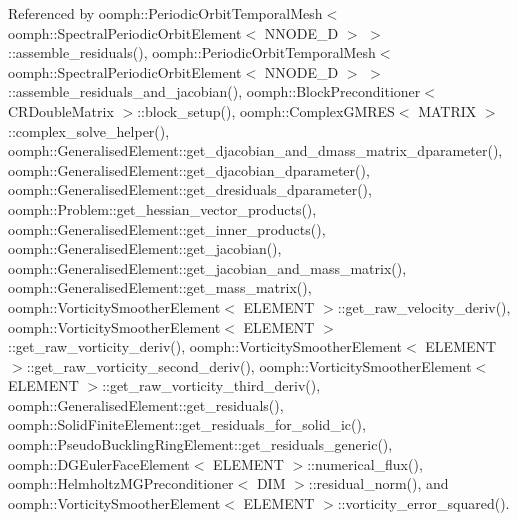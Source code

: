 Referenced by oomph\+::\+Periodic\+Orbit\+Temporal\+Mesh$<$ oomph\+::\+Spectral\+Periodic\+Orbit\+Element$<$ N\+N\+O\+D\+E\+\_\+D $>$ $>$\+::assemble\+\_\+residuals(), oomph\+::\+Periodic\+Orbit\+Temporal\+Mesh$<$ oomph\+::\+Spectral\+Periodic\+Orbit\+Element$<$ N\+N\+O\+D\+E\+\_\+D $>$ $>$\+::assemble\+\_\+residuals\+\_\+and\+\_\+jacobian(), oomph\+::\+Block\+Preconditioner$<$ C\+R\+Double\+Matrix $>$\+::block\+\_\+setup(), oomph\+::\+Complex\+G\+M\+R\+E\+S$<$ M\+A\+T\+R\+I\+X $>$\+::complex\+\_\+solve\+\_\+helper(), oomph\+::\+Generalised\+Element\+::get\+\_\+djacobian\+\_\+and\+\_\+dmass\+\_\+matrix\+\_\+dparameter(), oomph\+::\+Generalised\+Element\+::get\+\_\+djacobian\+\_\+dparameter(), oomph\+::\+Generalised\+Element\+::get\+\_\+dresiduals\+\_\+dparameter(), oomph\+::\+Problem\+::get\+\_\+hessian\+\_\+vector\+\_\+products(), oomph\+::\+Generalised\+Element\+::get\+\_\+inner\+\_\+products(), oomph\+::\+Generalised\+Element\+::get\+\_\+jacobian(), oomph\+::\+Generalised\+Element\+::get\+\_\+jacobian\+\_\+and\+\_\+mass\+\_\+matrix(), oomph\+::\+Generalised\+Element\+::get\+\_\+mass\+\_\+matrix(), oomph\+::\+Vorticity\+Smoother\+Element$<$ E\+L\+E\+M\+E\+N\+T $>$\+::get\+\_\+raw\+\_\+velocity\+\_\+deriv(), oomph\+::\+Vorticity\+Smoother\+Element$<$ E\+L\+E\+M\+E\+N\+T $>$\+::get\+\_\+raw\+\_\+vorticity\+\_\+deriv(), oomph\+::\+Vorticity\+Smoother\+Element$<$ E\+L\+E\+M\+E\+N\+T $>$\+::get\+\_\+raw\+\_\+vorticity\+\_\+second\+\_\+deriv(), oomph\+::\+Vorticity\+Smoother\+Element$<$ E\+L\+E\+M\+E\+N\+T $>$\+::get\+\_\+raw\+\_\+vorticity\+\_\+third\+\_\+deriv(), oomph\+::\+Generalised\+Element\+::get\+\_\+residuals(), oomph\+::\+Solid\+Finite\+Element\+::get\+\_\+residuals\+\_\+for\+\_\+solid\+\_\+ic(), oomph\+::\+Pseudo\+Buckling\+Ring\+Element\+::get\+\_\+residuals\+\_\+generic(), oomph\+::\+D\+G\+Euler\+Face\+Element$<$ E\+L\+E\+M\+E\+N\+T $>$\+::numerical\+\_\+flux(), oomph\+::\+Helmholtz\+M\+G\+Preconditioner$<$ D\+I\+M $>$\+::residual\+\_\+norm(), and oomph\+::\+Vorticity\+Smoother\+Element$<$ E\+L\+E\+M\+E\+N\+T $>$\+::vorticity\+\_\+error\+\_\+squared().

\mbox{\label{classoomph_1_1Vector_a7299888ed7f38cc2e891e1b50d47870d}} 
